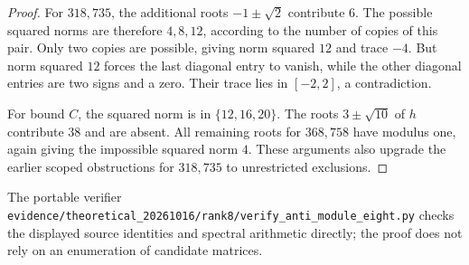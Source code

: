 \begin{proof}
For $318,735$, the additional roots $-1\pm\sqrt2$ contribute $6$.
The possible squared norms are therefore $4,8,12$, according to the
number of copies of this pair. Only two copies are possible, giving
norm squared $12$ and trace $-4$. But norm squared $12$ forces the last
diagonal entry to vanish, while the other diagonal entries are two
signs and a zero. Their trace lies in $[-2,2]$, a contradiction.

For bound $C$, the squared norm is in $\{12,16,20\}$. The roots
$3\pm\sqrt{10}$ of $h$ contribute $38$ and are absent. All remaining
roots for $368,758$ have modulus one, again giving the impossible
squared norm $4$. These arguments also upgrade the earlier scoped
obstructions for $318,735$ to unrestricted exclusions.
\end{proof}

The portable verifier
\texttt{evidence/theoretical\_20261016/rank8/verify\_anti\_module\_eight.py}
checks the displayed source identities and spectral arithmetic directly;
the proof does not rely on an enumeration of candidate matrices.
